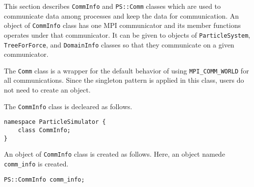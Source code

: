 This section describes {\tt CommInfo} and {\tt PS::Comm} classes which
are used to communicate data among processes and keep the data for
communication.  An object of {\tt CommInfo} class has one MPI
communicator and its member functions operates under that
communicator.  It can be given to objects of {\tt  ParticleSystem},
{\tt TreeForForce}, and {\tt DomainInfo} classes so that they
communicate on a given communicator.



The {\tt Comm} class is a wrapper for the default behavior of using
{\tt MPI\_COMM\_WORLD} for all communications.  Since the singleton
pattern is applied in this class, users do not need to create an
object.




The {\tt CommInfo} class is decleared as follows.

\begin{lstlisting}[caption=CommInfo0]
namespace ParticleSimulator {
    class CommInfo;
}
\end{lstlisting}

An object of {\tt CommInfo} class is created as follows. Here, an
object namede {\tt comm\_info} is created.



\begin{screen}
\begin{verbatim}
PS::CommInfo comm_info;
\end{verbatim}
\end{screen}


